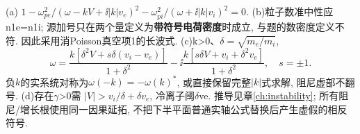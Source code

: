 \begin{solution}
(a) $1-\omega_{pe}^2/(\omega-kV+\ii|k|v_e)^2-\omega_{pi}^2/(\omega+\ii|k|v_i)^2=0$. (b)粒子数准中性应n1e=n1i; 源加号只在两个量定义为\textbf{带符号电荷密度}时成立, 与题的数密度定义不符. 因此采用消Poisson真空项1的长波式. (c)k>0、$\delta=\sqrt{m_e/m_i}$,
\begin{equation}
 \omega=\frac{k[\delta^2V+s\delta(v_i-v_e)]}{1+\delta^2}
 -\ii\frac{k[s\delta V+v_i+\delta^2v_e]}{1+\delta^2},\quad s=\pm1.
\end{equation}
负$k$的实系统对称为$\omega(-k)=-\omega(k)^*$, 或直接保留完整$|k|$式求解, 阻尼虚部不翻号. (d)存在\ensuremath{\gamma}>0需 $|V|>v_i/\delta+\delta v_e$, 冷离子阈\ensuremath{\delta}ve. 推导见章\ref{ch:instability}; 所有阻尼/增长根使用同一因果延拓, 不把下半平面普通实轴公式替换后产生虚假的相反符号.
\end{solution}

